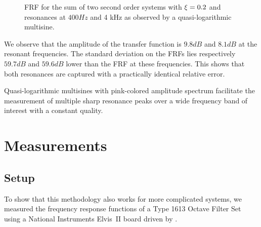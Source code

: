 \begin{figure}%
  \centering
  \setlength{}
  \setlength\figureheight{0.68\figurewidth}
  
  \caption[Simulated  of sum of two sub-systems.]{\gls{FRF} for the sum of two second order systems with $\xi_{}=0.2$ and            resonances at $ 400 \unit{Hz}$ and 4 \unit{kHz} as observed by a quasi-logarithmic multisine.}%
  \label{fig:excitation:sumSys}
\end{figure}

We observe that the amplitude of the transfer function is $9.8\unit{dB}$ and $8.1\unit{dB}$ at the resonant frequencies.
The standard deviation on the \glspl{FRF} lies respectively $59.7 \unit{dB}$ and $59.6 \unit{dB}$ lower than the \gls{FRF} at these frequencies. 
This shows that both resonances are captured with a practically identical relative error.

\begin{guideline}
  Quasi-logarithmic multisines with pink-colored amplitude spectrum facilitate the measurement of multiple sharp resonance peaks over a wide frequency band of interest with a constant quality.
\end{guideline}
  
\section{Measurements} 
\label{sec:excitation:measurement}
  \subsection{Setup}
    \label{sec:excitation:measurement:setup}
    To show that this methodology also works for more complicated systems, we measured the frequency response functions of a \bruelkjaer{} Type 1613 Octave Filter Set using a National Instruments Elvis~II board driven by \labview.
    
